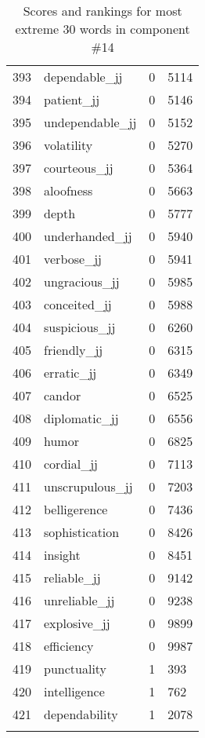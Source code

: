 \begin{longtable}[!htbp]{| rlr@{.}l |}
    393 & dependable\_jj & 0 & 5114 \\
    394 & patient\_jj & 0 & 5146 \\
    395 & undependable\_jj & 0 & 5152 \\
    396 & volatility & 0 & 5270 \\
    397 & courteous\_jj & 0 & 5364 \\
    398 & aloofness & 0 & 5663 \\
    399 & depth & 0 & 5777 \\
    400 & underhanded\_jj & 0 & 5940 \\
    401 & verbose\_jj & 0 & 5941 \\
    402 & ungracious\_jj & 0 & 5985 \\
    403 & conceited\_jj & 0 & 5988 \\
    404 & suspicious\_jj & 0 & 6260 \\
    405 & friendly\_jj & 0 & 6315 \\
    406 & erratic\_jj & 0 & 6349 \\
    407 & candor & 0 & 6525 \\
    408 & diplomatic\_jj & 0 & 6556 \\
    409 & humor & 0 & 6825 \\
    410 & cordial\_jj & 0 & 7113 \\
    411 & unscrupulous\_jj & 0 & 7203 \\
    412 & belligerence & 0 & 7436 \\
    413 & sophistication & 0 & 8426 \\
    414 & insight & 0 & 8451 \\
    415 & reliable\_jj & 0 & 9142 \\
    416 & unreliable\_jj & 0 & 9238 \\
    417 & explosive\_jj & 0 & 9899 \\
    418 & efficiency & 0 & 9987 \\
    419 & punctuality & 1 & 393 \\
    420 & intelligence & 1 & 762 \\
    421 & dependability & 1 & 2078 \\
    \hline
    \caption{Scores and rankings for most extreme 30 words in component \#14} \\
\end{longtable}
